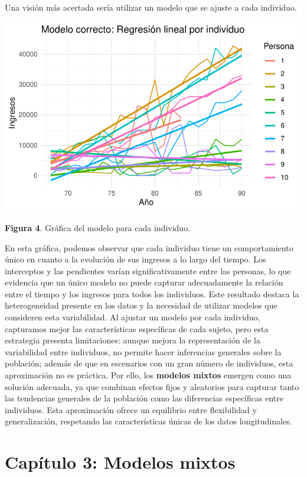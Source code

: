 \documentclass[
  letterpaper,
  DIV=11,
  numbers=noendperiod]{scrreprt}
\begin{document}
Una visión más acertada sería utilizar un modelo que se ajuste a cada
individuo.

\includegraphics{cap2_files/figure-pdf/unnamed-chunk-9-1.pdf}

\textbf{Figura 4}. Gráfica del modelo para cada individuo.

En esta gráfica, podemos observar que cada individuo tiene un
comportamiento único en cuanto a la evolución de sus ingresos a lo largo
del tiempo. Los interceptos y las pendientes varían significativamente
entre las personas, lo que evidencia que un único modelo no puede
capturar adecuadamente la relación entre el tiempo y los ingresos para
todos los individuos. Este resultado destaca la heterogeneidad presente
en los datos y la necesidad de utilizar modelos que consideren esta
variabilidad. Al ajustar un modelo por cada individuo, capturamos mejor
las características específicas de cada sujeto, pero esta estrategia
presenta limitaciones: aunque mejora la representación de la
variabilidad entre individuos, no permite hacer inferencias generales
sobre la población; además de que en escenarios con un gran número de
individuos, esta aproximación no es práctica. Por ello, los
\textbf{modelos mixtos} emergen como una solución adecuada, ya que
combinan efectos fijos y aleatorios para capturar tanto las tendencias
generales de la población como las diferencias específicas entre
individuos. Esta aproximación ofrece un equilibrio entre flexibilidad y
generalización, respetando las características únicas de los datos
longitudinales.


\chapter{Capítulo 3: Modelos mixtos}\label{capuxedtulo-3-modelos-mixtos}
\end{document}
